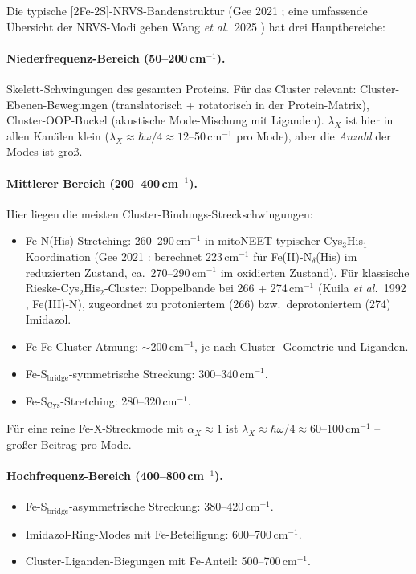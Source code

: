 \documentclass[11pt,a4paper,twoside]{article}
\theoremstyle{remark}
\begin{document}
Die typische [2Fe-2S]-NRVS-Bandenstruktur (Gee 2021 \cite{Gee2021}; 
eine umfassende \"Ubersicht der NRVS-Modi geben Wang \emph{et al.}\ 
2025 \cite{Wang2025}) hat drei Hauptbereiche:

\paragraph{Niederfrequenz-Bereich (50--200\,cm$^{-1}$).}
Skelett-Schwingungen des gesamten Proteins. F\"ur das Cluster relevant:
Cluster-Ebenen-Bewegungen (translatorisch + rotatorisch in der
Protein-Matrix), Cluster-OOP-Buckel (akustische Mode-Mischung mit
Liganden). $\lambda_X$ ist hier in allen Kan\"alen klein
($\lambda_X \approx \hbar\omega/4 \approx 12$--50\,cm$^{-1}$ pro
Mode), aber die \emph{Anzahl} der Modes ist gro{\ss}.

\paragraph{Mittlerer Bereich (200--400\,cm$^{-1}$).}
Hier liegen die meisten Cluster-Bindungs-Streckschwingungen:
\begin{itemize}\setlength{\itemsep}{0pt}
  \item Fe-N(His)-Stretching:
        260--290\,cm$^{-1}$ in mitoNEET-typischer Cys$_3$His$_1$-
        Koordination (Gee 2021 \cite{Gee2021}: berechnet 223\,cm$^{-1}$
        f\"ur Fe(II)-N$_\delta$(His) im reduzierten Zustand, ca.\
        270--290\,cm$^{-1}$ im oxidierten Zustand). F\"ur klassische
        Rieske-Cys$_2$His$_2$-Cluster: Doppelbande bei 266 + 274\,cm$^{-1}$
        (Kuila \emph{et al.}\ 1992 \cite{Kuila1992}, Fe(III)-N), zugeordnet
        zu protoniertem (266) bzw.\ deprotoniertem (274) Imidazol.
  \item Fe-Fe-Cluster-Atmung: $\sim 200$\,cm$^{-1}$, je nach Cluster-
        Geometrie und Liganden.
  \item Fe-S$_\text{bridge}$-symmetrische Streckung: 300--340\,cm$^{-1}$.
  \item Fe-S$_\text{Cys}$-Stretching: 280--320\,cm$^{-1}$.
\end{itemize}
F\"ur eine reine Fe-X-Streckmode mit $\alpha_X \approx 1$ ist
$\lambda_X \approx \hbar\omega/4 \approx 60$--$100$\,cm$^{-1}$ -- gro{\ss}er
Beitrag pro Mode.

\paragraph{Hochfrequenz-Bereich (400--800\,cm$^{-1}$).}
\begin{itemize}\setlength{\itemsep}{0pt}
  \item Fe-S$_\text{bridge}$-asymmetrische Streckung: 380--420\,cm$^{-1}$.
  \item Imidazol-Ring-Modes mit Fe-Beteiligung: 600--700\,cm$^{-1}$.
  \item Cluster-Liganden-Biegungen mit Fe-Anteil: 500--700\,cm$^{-1}$.
\end{itemize}
\end{document}
